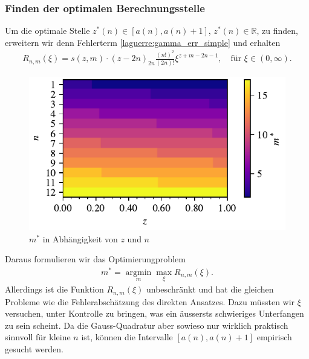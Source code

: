 \subsubsection{Finden der optimalen Berechnungsstelle}
Um die optimale Stelle $z^*(n) \in \left[a(n), a(n) + 1\right]$,
$z^*(n) \in \mathbb{R}$,
zu finden,
erweitern wir denn Fehlerterm \eqref{laguerre:gamma_err_simple}
und erhalten
\begin{align}
R_{n,m}(\xi)
=
s(z, m) \cdot (z - 2n)_{2n} \frac{(n!)^2}{(2n)!} \xi^{z + m - 2n - 1}
,\quad
\text{für }
\xi \in (0, \infty)
\label{laguerre:gamma_err_shifted}
.
\end{align}
%
\begin{figure}
\centering
\includegraphics{papers/laguerre/images/targets.pdf}
\caption{$m^*$ in Abhängigkeit von $z$ und $n$}
\label{laguerre:fig:targets}
\end{figure}
%
Daraus formulieren wir das Optimierungproblem
%
\begin{align*}
m^*
=
\operatorname*{argmin}_m \max_\xi R_{n,m}(\xi)
.
\end{align*}
Allerdings ist die Funktion $R_{n,m}(\xi)$ unbeschränkt und
hat die gleichen Probleme wie die Fehlerabschätzung des direkten Ansatzes.
Dazu müssten wir $\xi$ versuchen,
unter Kontrolle zu bringen,
was ein äussersts schwieriges Unterfangen zu sein scheint.
Da die Gauss-Quadratur aber sowieso
nur wirklich praktisch sinnvoll für kleine $n$ ist,
können die Intervalle $[a(n), a(n)+1]$ empirisch gesucht werden.

